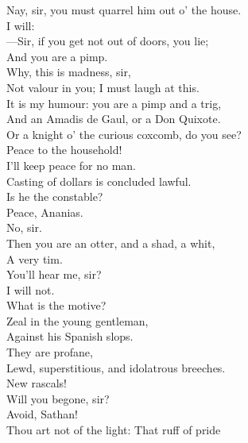 \documentclass[a4paper,oneside]{memoir}
\begin{document}
\begin{drama*}
\facespeaks Nay, sir, you must quarrel him out o' the house.\\
\kastrilspeaks I will:\\
---Sir, if you get not out of doors, you lie;\\
And you are a pimp.\\
\surlyspeaks {} Why, this is madness, sir,\\
Not valour in you; I must laugh at this.\\
\kastrilspeaks It is my humour: you are a pimp and a trig,\\
And an Amadis de Gaul, or a Don Quixote.\\
\druggerspeaks Or a knight o' the curious coxcomb, do you see?\\
\ananiasspeaks Peace to the household!\\
\kastrilspeaks {} I'll keep peace for no man.\\
\ananiasspeaks Casting of dollars is concluded lawful.\\
\kastrilspeaks Is he the constable?\\
\subtlespeaks {} Peace, Ananias.\\
\facespeaks No, sir.\\
\kastrilspeaks {} Then you are an otter, and a shad, a whit,\\
A very tim.\\
\surlyspeaks {} You'll hear me, sir?\\
\kastrilspeaks {} I will not.\\
\ananiasspeaks What is the motive?\\
\subtlespeaks {} Zeal in the young gentleman,\\
Against his Spanish slops.\\
\ananiasspeaks {} They are profane,\\
Lewd, superstitious, and idolatrous breeches.\\
\surlyspeaks New rascals!\\
\kastrilspeaks {} Will you begone, sir?\\
\ananiasspeaks {} Avoid, Sathan!\\
Thou art not of the light: That ruff of pride\\

\end{drama*}
\end{document}
